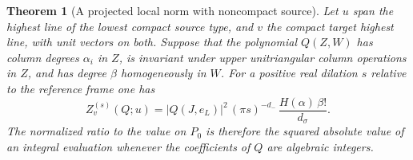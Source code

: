\documentclass[a4paper,11pt]{article}
\newtheorem{theorem}[proposition]{Theorem}
\theoremstyle{definition}
\theoremstyle{remark}
\numberwithin{equation}{section}
\begin{document}
\begin{theorem}[A projected local norm with noncompact source]
\label{thm:pen185}
Let \(u\) span the highest line of the lowest compact
source type, and \(v\) the compact target highest line,
with unit vectors on both. Suppose that the polynomial
\(Q(Z,W)\) has column degrees \(\alpha_i\) in \(Z\), is
invariant under upper unitriangular column operations in
\(Z\), and has degree \(\beta\) homogeneously in \(W\).
For a positive real dilation \(s\) relative to the
reference frame one has
\begin{equation}
 Z_v^{(s)}(Q;u)=
   |Q(J,e_L)|^2\,
   (\pi s)^{-d_-}\,\frac{H(\alpha)\,\beta!}{d_\sigma}.
                                                        \label{eq:pen185}
\end{equation}
The normalized ratio to the value on \(P_0\) is therefore
the squared absolute value of an integral evaluation whenever
the coefficients of \(Q\) are algebraic integers.
\end{theorem}
\end{document}
